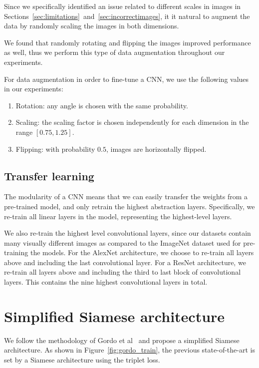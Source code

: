 Since we specifically identified an issue related to different scales
in images in Sections~\ref{sec:limitations}~and~\ref{sec:incorrectimages},
it it natural to augment the data by randomly scaling the images in both
dimensions.

We found that randomly rotating and flipping the images improved
performance as well, thus we perform this type of data augmentation
throughout our experiments.

For data augmentation in order to fine-tune a CNN, we use the
following values in our experiments:
\begin{enumerate}
    \item Rotation: any angle is chosen with the same probability.
    \item Scaling: the scaling factor is chosen independently for each
    dimension in the range $[0.75,1.25]$.
    \item Flipping: with probability $0.5$, images are horizontally
    flipped.
\end{enumerate}

\subsection{Transfer learning}
The modularity of a CNN means that we can easily transfer
the weights from a pre-trained model, and only retrain the highest
abstraction layers. Specifically, we re-train all linear layers in the
model, representing the highest-level layers.

We also re-train the highest level convolutional layers, since our datasets
contain many visually different images as compared to the ImageNet
dataset used for pre-training the models.
For the AlexNet architecture, we choose to re-train all layers above
and including the last convolutional layer.
For a ResNet architecture, we re-train all layers above and including the
third to last block of convolutional layers. This contains the
nine highest convolutional layers in total.

\section{Simplified Siamese architecture}\label{sec:simplifiedsiam}
We follow the methodology of Gordo et al~\cite{gordo_deep_2016} and
propose a simplified Siamese architecture. As shown in
Figure~\ref{fig:gordo_train}, the previous state-of-the-art is set
by a Siamese architecture using the triplet loss.

